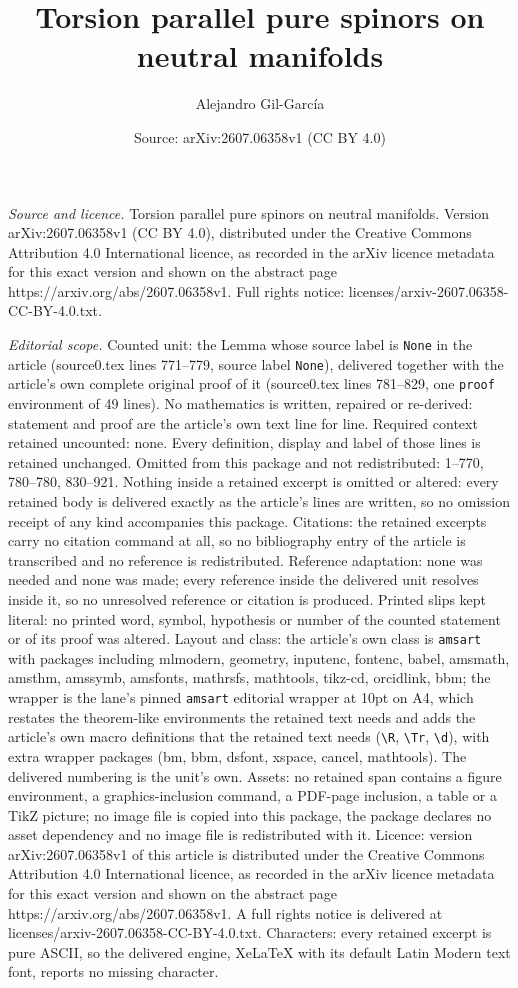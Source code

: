 \documentclass[10pt,a4paper]{amsart}
\title[Torsion parallel pure spinors on neutral manifolds]{Torsion parallel pure spinors on neutral manifolds}
\author{Alejandro Gil-Garc\'ia}
\date{Source: arXiv:2607.06358v1 (CC BY 4.0)}
\begin{document}
\maketitle

\noindent\emph{Source and licence.} Torsion parallel pure spinors on neutral manifolds. Version arXiv:2607.06358v1 (CC BY 4.0), distributed under the Creative Commons Attribution 4.0 International licence, as recorded in the arXiv licence metadata for this exact version and shown on the abstract page https://arxiv.org/abs/2607.06358v1. Full rights notice: licenses/arxiv-2607.06358-CC-BY-4.0.txt.\par\smallskip

\noindent\textit{Editorial scope.} Counted unit: the Lemma whose source label is \texttt{None} in the article (source0.tex lines 771--779, source label \texttt{None}), delivered together with the article's own complete original proof of it (source0.tex lines 781--829, one \texttt{proof} environment of 49 lines). No mathematics is written, repaired or re-derived: statement and proof are the article's own text line for line. Required context retained uncounted: none. Every definition, display and label of those lines is retained unchanged. Omitted from this package and not redistributed: 1--770, 780--780, 830--921. Nothing inside a retained excerpt is omitted or altered: every retained body is delivered exactly as the article's lines are written, so no omission receipt of any kind accompanies this package. Citations: the retained excerpts carry no citation command at all, so no bibliography entry of the article is transcribed and no reference is redistributed. Reference adaptation: none was needed and none was made; every reference inside the delivered unit resolves inside it, so no unresolved reference or citation is produced. Printed slips kept literal: no printed word, symbol, hypothesis or number of the counted statement or of its proof was altered. Layout and class: the article's own class is \texttt{amsart} with packages including mlmodern, geometry, inputenc, fontenc, babel, amsmath, amsthm, amssymb, amsfonts, mathrsfs, mathtools, tikz-cd, orcidlink, bbm; the wrapper is the lane's pinned \texttt{amsart} editorial wrapper at 10pt on A4, which restates the theorem-like environments the retained text needs and adds the article's own macro definitions that the retained text needs (\texttt{\textbackslash R}, \texttt{\textbackslash Tr}, \texttt{\textbackslash d}), with extra wrapper packages (bm, bbm, dsfont, xspace, cancel, mathtools). The delivered numbering is the unit's own. Assets: no retained span contains a figure environment, a graphics-inclusion command, a PDF-page inclusion, a table or a TikZ picture; no image file is copied into this package, the package declares no asset dependency and no image file is redistributed with it. Licence: version arXiv:2607.06358v1 of this article is distributed under the Creative Commons Attribution 4.0 International licence, as recorded in the arXiv licence metadata for this exact version and shown on the abstract page https://arxiv.org/abs/2607.06358v1. A full rights notice is delivered at licenses/arxiv-2607.06358-CC-BY-4.0.txt. Characters: every retained excerpt is pure ASCII, so the delivered engine, XeLaTeX with its default Latin Modern text font, reports no missing character.
\end{document}
